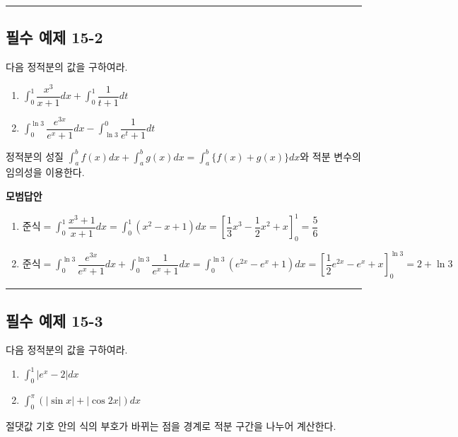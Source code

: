 \documentclass[a4paper,11pt]{article}
\begin{document}
\vspace{0.5cm}
\hrule
\vspace{0.5cm}

\subsection*{필수 예제 15-2}
다음 정적분의 값을 구하여라.
\begin{enumerate}[label=(\arabic*)]
    \item $\displaystyle\int_{0}^{1} \dfrac{x^3}{x+1} dx + \int_{0}^{1} \dfrac{1}{t+1} dt$
    \item $\displaystyle\int_{0}^{\ln 3} \dfrac{e^{3x}}{e^x+1} dx - \int_{\ln 3}^{0} \dfrac{1}{e^t+1} dt$
\end{enumerate}

\begin{studybox}
정적분의 성질 $\int_a^b f(x)dx + \int_a^b g(x)dx = \int_a^b \{f(x)+g(x)\}dx$와 적분 변수의 임의성을 이용한다.
\end{studybox}

\textbf{모범답안}
\begin{enumerate}[label=(\arabic*)]
    \item $\text{준식} = \int_{0}^{1} \dfrac{x^3+1}{x+1} dx = \int_{0}^{1} (x^2-x+1) dx = \left[ \dfrac{1}{3}x^3 - \dfrac{1}{2}x^2 + x \right]_{0}^{1} = \dfrac{5}{6}$
    \item $\text{준식} = \int_{0}^{\ln 3} \dfrac{e^{3x}}{e^x+1} dx + \int_{0}^{\ln 3} \dfrac{1}{e^x+1} dx = \int_{0}^{\ln 3} (e^{2x}-e^x+1) dx = \left[ \dfrac{1}{2}e^{2x}-e^x+x \right]_{0}^{\ln 3} = 2+\ln 3$
\end{enumerate}

\vspace{0.5cm}
\hrule
\vspace{0.5cm}

\subsection*{필수 예제 15-3}
다음 정적분의 값을 구하여라.
\begin{enumerate}[label=(\arabic*)]
    \item $\displaystyle\int_{0}^{1} |e^x-2| dx$
    \item $\displaystyle\int_{0}^{\pi} (|\sin x| + |\cos 2x|) dx$
\end{enumerate}

\begin{studybox}
절댓값 기호 안의 식의 부호가 바뀌는 점을 경계로 적분 구간을 나누어 계산한다.
\end{studybox}
\end{document}
